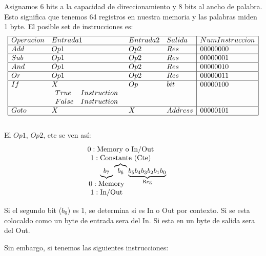 \documentclass{report}
\begin{document}
Asignamos 6 bits a la capacidad de direccionamiento y 8 bits al ancho de palabra.
Esto significa que tenemos 64 registros en nuestra memoria y las palabras miden 1 byte.
\newpage
El posible set de instrucciones es:\\
\[
	\begin{array}{|llll|l|} \hline
		Operacion & Entrada1               & Entrada2 & Salida  & NumInstruccion \\ \hline
		Add       & Op1                    & Op2      & Res     & 00000000       \\ \hline
		Sub       & Op1                    & Op2      & Res     & 00000001       \\ \hline
		And       & Op1                    & Op2      & Res     & 00000010       \\ \hline
		Or        & Op1                    & Op2      & Res     & 00000011       \\ \hline
		If        & X                      & Op       & bit     & 00000100       \\
		          & \begin{array}{ll}
			            True  & Instruction \\
			            False & Instruction \\
		            \end{array} &          &         &                           \\ \hline
		Goto      & X                      & X        & Address & 00000101       \\ \hline
	\end{array}
\] \\
El \(Op1\), \(Op2\), etc se ven así: \\
\[
	\underbrace{b_7}_{\mathclap{
		\begin{array}{c}
			0: \text{Memory} \\
			1: \text{In/Out}
		\end{array}
	}
	}
	\overbrace{b_6}^{\mathclap{
		\begin{array}{c}
			0: \text{Memory o In/Out} \\
			1: \text{Constante (Cte)}
		\end{array}
	}
	}
	\underbrace{b_5b_4b_3b_2b_1b_0}_{\mathclap{\text{Reg}}}
\]

Si el segundo bit (\(b_6\)) es 1, se determina si es In o Out por contexto. Si se esta colocaldo como un byte de entrada sera del In. Si esta en un byte de salida sera del Out.

Sin embargo, si tenemos las siguientes instrucciones:\\
\end{document}
